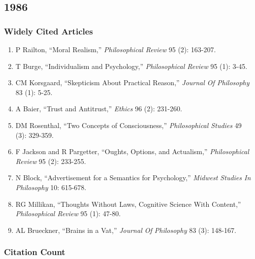 \documentclass[
  10pt,
  letterpaper,
  DIV=11,
  numbers=noendperiod,
  twoside]{scrartcl}
\providecommand{\tightlist}{%
  \setlength{\itemsep}{0pt}\setlength{\parskip}{0pt}}\usepackage{longtable,booktabs,array}
\begin{document}
\newpage

\subsection{1986}\label{sec-s1986}

\subsubsection*{Widely Cited Articles}\label{widely-cited-articles-10}

\begin{enumerate}
\def\labelenumi{\arabic{enumi}.}
\tightlist
\item
  P Railton, ``Moral Realism,'' \emph{Philosophical Review} 95 (2):
  163-207.
\item
  T Burge, ``Individualism and Psychology,'' \emph{Philosophical Review}
  95 (1): 3-45.
\item
  CM Korsgaard, ``Skepticism About Practical Reason,'' \emph{Journal Of
  Philosophy} 83 (1): 5-25.
\item
  A Baier, ``Trust and Antitrust,'' \emph{Ethics} 96 (2): 231-260.
\item
  DM Rosenthal, ``Two Concepts of Consciousness,'' \emph{Philosophical
  Studies} 49 (3): 329-359.
\item
  F Jackson and R Pargetter, ``Oughts, Options, and Actualism,''
  \emph{Philosophical Review} 95 (2): 233-255.
\item
  N Block, ``Advertisement for a Semantics for Psychology,''
  \emph{Midwest Studies In Philosophy} 10: 615-678.
\item
  RG Millikan, ``Thoughts Without Laws, Cognitive Science With
  Content,'' \emph{Philosophical Review} 95 (1): 47-80.
\item
  AL Brueckner, ``Brains in a Vat,'' \emph{Journal Of Philosophy} 83
  (3): 148-167.
\end{enumerate}

\subsubsection*{Citation Count}\label{sec-count-1986}
\end{document}

